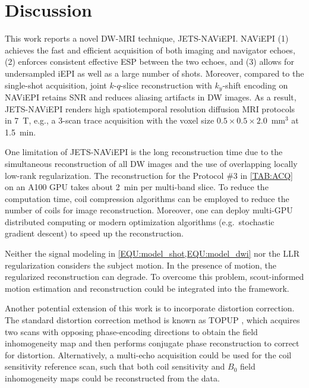 \documentclass[preprint,12pt,authoryear,review]{elsarticle}
\begin{document}
    \clearpage

    \section{Discussion}
    \label{SEC:Disc}

    This work reports a novel DW-MRI technique, JETS-NAViEPI.
    NAViEPI (1) achieves the fast and efficient acquisition of
    both imaging and navigator echoes,
    (2) enforces consistent effective ESP between the two echoes, and
    (3) allows for undersampled iEPI as well as a large number of shots.
    Moreover, compared to the single-shot acquisition,
    joint $k$-$q$-slice reconstruction
    with $k_y$-shift encoding on NAViEPI
    retains SNR and reduces aliasing artifacts in DW images.
    As a result, JETS-NAViEPI renders high spatiotemporal resolution
    diffusion MRI protocols in \SI{7}{\tesla},
    e.g., a 3-scan trace acquisition with the voxel size
    $0.5\times0.5\times2.0$~mm$^3$ at \SI{1.5}{\minute}.

    One limitation of JETS-NAViEPI is the long reconstruction time
    due to the simultaneous reconstruction of all DW images and
    the use of overlapping locally low-rank regularization.
    The reconstruction for the Protocol \#3 in \cref{TAB:ACQ}
    on an A100 GPU takes about \SI{2}{\minute} per multi-band slice.
    To reduce the computation time, coil compression algorithms
    \citep{buehrer_2007_scc,huang_2008_scc}
    can be employed to reduce the number of coils for image reconstruction.
    Moreover, one can deploy multi-GPU distributed computing
    or modern optimization algorithms
    (e.g.~stochastic gradient descent) \citep{ong_2020_extreme}
    to speed up the reconstruction.

    Neither the signal modeling in
    \cref{EQU:model_shot,EQU:model_dwi}
    nor the LLR regularization considers the subject motion.
    In the presence of motion, the regularized reconstruction can degrade.
    To overcome this problem, scout-informed motion estimation
    and reconstruction \citep{polak_2022_samer}
    could be integrated into the framework.

    Another potential extension of this work is
    to incorporate distortion correction.
    The standard distortion correction method is
    known as TOPUP \citep{andersson_2003_topup},
    which acquires two scans
    with opposing phase-encoding directions to
    obtain the field inhomogeneity map and
    then performs conjugate phase reconstruction
    to correct for distortion.
    Alternatively, a multi-echo acquisition could be used
    for the coil sensitivity reference scan, such that
    both coil sensitivity and $B_0$ field inhomogeneity maps
    could be reconstructed from the data.
\end{document}
